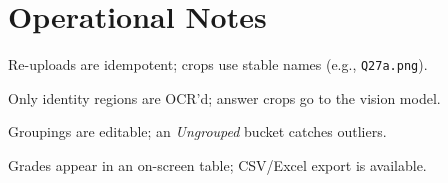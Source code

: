 \documentclass[ms,twoside,print]{nuthesis}
\begin{document}
\section{Operational Notes}
\begin{compactitem}
  \item Re-uploads are idempotent; crops use stable names (e.g., \texttt{Q27a.png}).
  \item Only identity regions are OCR’d; answer crops go to the vision model.
  \item Groupings are editable; an \textit{Ungrouped} bucket catches outliers.
  \item Grades appear in an on-screen table; CSV/Excel export is available.
\end{compactitem}


\backmatter


\end{document}
